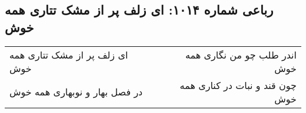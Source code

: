 \begin{center}
\section*{رباعی شماره ۱۰۱۴: ای زلف پر از مشک تتاری همه خوش}
\label{sec:1014}
\begin{longtable}{l p{0.5cm} r}
ای زلف پر از مشک تتاری همه خوش
&&
اندر طلب چو من نگاری همه خوش
\\
در فصل بهار و نوبهاری همه خوش
&&
چون قند و نبات در کناری همه خوش
\\
\end{longtable}
\end{center}
